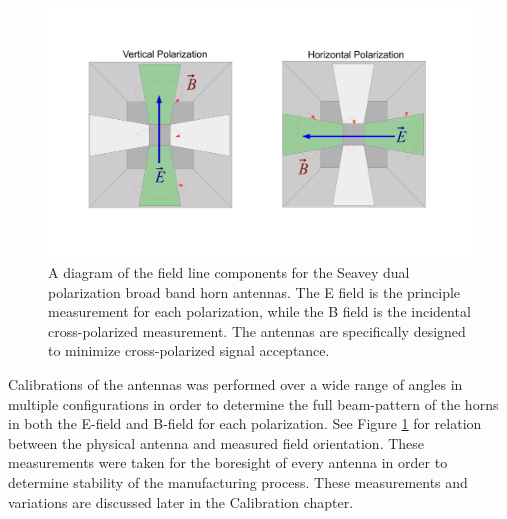 	
	
\begin{figure}
\centering
	\includegraphics[width=\textwidth]{figures/AntennaPol}
	\caption{A diagram of the field line components for the Seavey dual polarization broad band horn antennas.  The E field is the principle measurement for each polarization, while the B field is the incidental cross-polarized measurement.  The antennas are specifically designed to minimize cross-polarized signal acceptance.}
	\label{fig:AntennaPol}
\end{figure}

	
	
	Calibrations of the antennas was performed over a wide range of angles in multiple configurations in order to determine the full beam-pattern of the horns in both the E-field and B-field for each polarization. See Figure \ref{fig:AntennaPol} for relation between the physical antenna and measured field orientation.  These measurements were taken for the boresight of every antenna in order to determine stability of the manufacturing process.  These measurements and variations are discussed later in the Calibration chapter.
	

